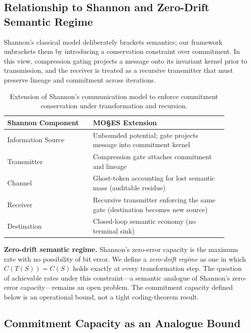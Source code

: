 \documentclass[11pt,a4paper]{article}
\begin{document}
\subsection{Relationship to Shannon and Zero-Drift Semantic Regime}
\label{sec:shannon-extension}

Shannon's classical model deliberately brackets semantics; our framework unbrackets them by introducing a conservation constraint over commitment. In this view, compression gating projects a message onto its invariant kernel prior to transmission, and the receiver is treated as a recursive transmitter that must preserve lineage and commitment across iterations.

\begin{table}[htbp]
\centering
\begin{tabular}{p{0.35\linewidth}p{0.55\linewidth}}
\toprule
\textbf{Shannon Component} & \textbf{MO\S{}ES\texttrademark{} Extension} \\
\midrule
Information Source & Unbounded potential; gate projects message into commitment kernel \\
Transmitter & Compression gate attaches commitment and lineage \\
Channel & Ghost-token accounting for lost semantic mass (auditable residue) \\
Receiver & Recursive transmitter enforcing the same gate (destination becomes new source) \\
Destination & Closed-loop semantic economy (no terminal sink) \\
\bottomrule
\end{tabular}
\caption{Extension of Shannon's communication model to enforce commitment conservation under transformation and recursion.}
\label{tab:shannon-extension}
\end{table}

\noindent\textbf{Zero-drift semantic regime.} Shannon's zero-error capacity is the maximum rate with no possibility of bit error. We define a \emph{zero-drift regime} as one in which $C(T(S)) = C(S)$ holds exactly at every transformation step. The question of achievable rates under this constraint---a semantic analogue of Shannon's zero-error capacity---remains an open problem. The commitment capacity defined below is an operational bound, not a tight coding-theorem result.

\subsection{Commitment Capacity as an Analogue Bound}
\end{document}
